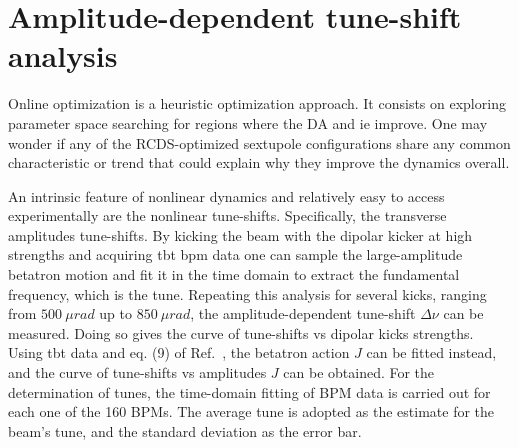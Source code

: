 \section{Amplitude-dependent tune-shift analysis}
Online optimization is a heuristic optimization approach.
It consists on exploring parameter space searching for regions where the \gls*{DA} and \gls*{ie} improve.
One may wonder if any of the \gls*{RCDS}-optimized sextupole configurations share any common characteristic or trend that could explain why they improve the dynamics overall.

An intrinsic feature of nonlinear dynamics and relatively easy to access experimentally are the nonlinear tune-shifts. Specifically, the transverse amplitudes tune-shifts. By kicking the beam with the dipolar kicker at high strengths and acquiring \gls*{tbt} \gls*{bpm} data one can sample the large-amplitude betatron motion and fit it in the time domain to extract the fundamental frequency, which is the tune. Repeating this analysis for  several kicks, ranging from $500~\unit{\mu rad}$ up to $850~\unit{\mu rad}$, the amplitude-dependent tune-shift $\Delta\nu$ can be measured. Doing so gives the curve of tune-shifts vs dipolar kicks strengths. Using \gls*{tbt} data and eq. (9) of Ref.~\cite{resende_equilibrium_2021}, the betatron action $J$ can be fitted instead, and the curve of tune-shifts vs amplitudes $J$ can be obtained. For the determination of tunes, the time-domain fitting of BPM data is carried out for each one of the 160 BPMs. The average tune is adopted as the estimate for the beam's tune, and the standard deviation as the error bar.

